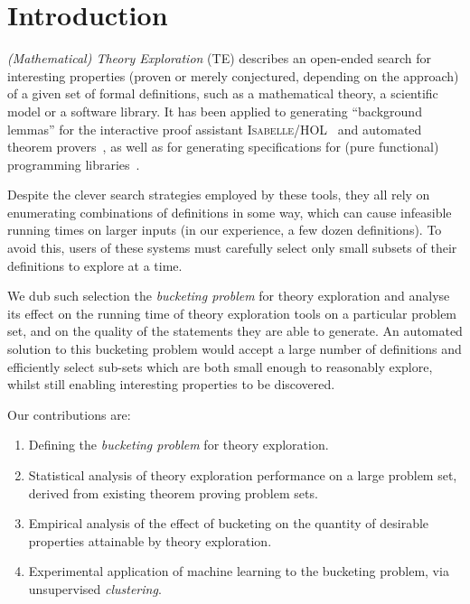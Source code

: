 \section{Introduction}

\emph{(Mathematical) Theory Exploration} (TE) describes an open-ended search for
interesting properties (proven or merely conjectured, depending on the approach)
of a given set of formal definitions, such as a mathematical theory, a
scientific model or a software library. It has been applied to generating
``background lemmas'' for the interactive proof assistant
\textsc{Isabelle/HOL}~\cite{johansson2009isacosy,Hipster} and automated
theorem provers~\cite{claessen2013automating}, as well as for generating
specifications for (pure functional) programming
libraries~\cite{QuickSpec,smallbone2017quick,braquehais2017speculate}.

Despite the clever search strategies employed by these tools, they all rely on
enumerating combinations of definitions in some way, which can cause infeasible
running times on larger inputs (in our experience, a few dozen definitions). To
avoid this, users of these systems must carefully select only small subsets of
their definitions to explore at a time.

We dub such selection the \emph{bucketing problem} for theory exploration and
analyse its effect on the running time of theory exploration tools on a
particular problem set, and on the quality of the statements they are able to
generate. An automated solution to this bucketing problem would accept a large
number of definitions and efficiently select sub-sets which are both small
enough to reasonably explore, whilst still enabling interesting properties to be
discovered.

Our contributions are:

\begin{enumerate}
  \item Defining the \emph{bucketing problem} for theory exploration.
  \item Statistical analysis of theory exploration performance on a large
    problem set, derived from existing theorem proving problem sets.
  \item Empirical analysis of the effect of bucketing on the quantity of
    desirable properties attainable by theory exploration.
  \item Experimental application of machine learning to the bucketing problem,
    via unsupervised \emph{clustering}.
\end{enumerate}

